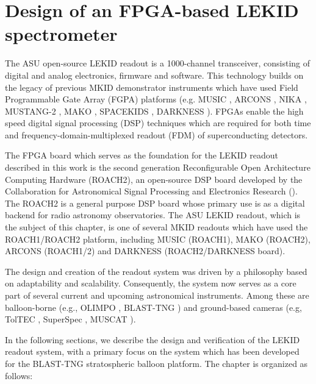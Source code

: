 \chapter{Design of an FPGA-based LEKID spectrometer}\label{readout}

The ASU open-source LEKID readout is a 1000-channel transceiver, consisting of digital and analog electronics, firmware and software. This technology builds on the legacy of previous MKID demonstrator instruments which have used Field Programmable Gate Array (FGPA) platforms (e.g. MUSIC \citep{golwala2012status}, ARCONS \citep{mchugh2012readout}, NIKA \citep{monfardini2014latest}, MUSTANG-2 \citep{dicker2014mustang2}, MAKO \citep{swenson2012mako}, SPACEKIDS \citep{van2016multiplexed}, DARKNESS \citep{strader2016digitial}). FPGAs enable the high speed digital signal processing (DSP) techniques which are required for both time and frequency-domain-multiplexed readout (FDM) of superconducting detectors.

The FPGA board which serves as the foundation for the LEKID readout described in this work is the second generation Reconfigurable Open Architecture Computing Hardware (ROACH2), an open-source DSP board developed by the Collaboration for Astronomical Signal Processing and Electronics Research (\citet{werthimer2011casper, hickish2016decade}). The ROACH2 is a general purpose DSP board whose primary use is as a digital backend for radio astronomy observatories. The ASU LEKID readout, which is the subject of this chapter, is one of several MKID readouts which have used the ROACH1/ROACH2 platform, including MUSIC (ROACH1), MAKO (ROACH2), ARCONS (ROACH1/2) and DARKNESS (ROACH2/DARKNESS board).

The design and creation of the readout system was driven by a philosophy based on adaptability and scalability. Consequently, the system now serves as a core part of several current and upcoming astronomical instruments. Among these are balloon-borne (e.g., OLIMPO \citep{masi2019kinetic}, BLAST-TNG \citep{gordon2016}) and ground-based cameras (e.g, TolTEC \citep{austermann2018millimeter}, SuperSpec \citep{wheeler2018superspec}, MUSCAT \citep{brien2018muscat}).

In the following sections, we describe the design and verification of the LEKID readout system, with a primary focus on the system which has been developed for the BLAST-TNG stratospheric balloon platform. The chapter is organized as follows:

